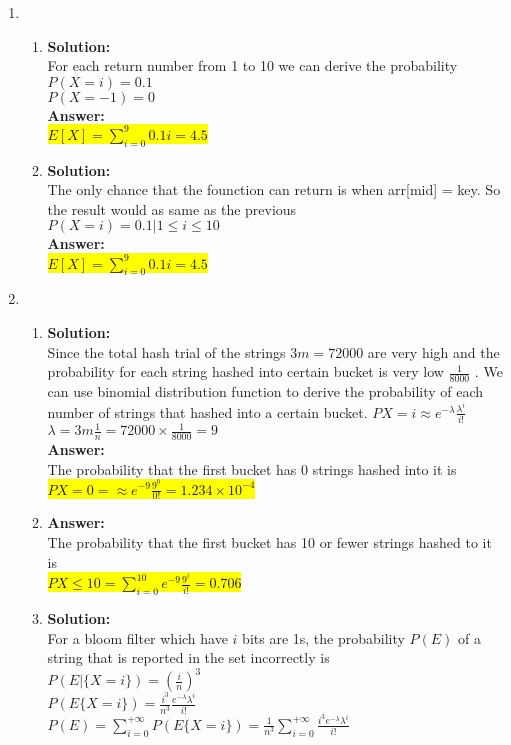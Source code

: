 \documentclass{article}
\newcommand{\myansw}{\textbf{Answer:}\\}
\newcommand{\mysolu}{\textbf{Solution:}\\}
\begin{document}
\begin{enumerate}
	\item
	\begin{enumerate}
		\item
		\mysolu
		For each return number from 1 to 10 we can derive the probability\\
		$P(X=i) = 0.1$\\
		$P(X = -1) = 0$\\
		\myansw
		\colorbox{yellow}{$E[X] = \sum\limits_{i=0}^{9}0.1i =4.5$}\\
		\item
		\mysolu
		The only chance that the founction can return is when arr[mid] = key. So the result would as same as the previous\\
		$P(X=i) = 0.1 | 1\leq i \leq 10$\\
		\myansw
		\colorbox{yellow}{$E[X] = \sum\limits_{i=0}^{9}0.1i =4.5$}\\
	\end{enumerate}
	\item 
	\begin{enumerate}
		\item
		\mysolu
		Since the total hash trial of the strings ${3m = 72000}$ are very high and the probability for each string hashed into certain bucket is very low ${\frac{1}{8000}}$ . We can use binomial distribution function to derive the probability of each number of strings that hashed into a certain bucket.
		$P{X=i} \approx e^{- \lambda}\frac{\lambda^i}{i!}$\\
		${\lambda = 3m \frac{1}{n} = 72000 \times 
		\frac{1}{8000} = 9}$\\
		\myansw
		The probability that the first bucket has 0 strings hashed into it is\\
		\colorbox{yellow}{
			${P{X = 0} =\approx e^{-9}\frac{9^0}{0!}=1.234\times 10^{-4}}$
		}\\
		\item
		\myansw
		The probability that the first bucket has 10 or fewer strings hashed to it is\\
		\colorbox{yellow}{
			${P{X \leq 10} = \sum\limits_{i=0}^{10} e^{-9}\frac{9^i}{i!}=0.706}$
		}
		\item
		\mysolu
		For a bloom filter which have ${i}$ bits are 1s, the probability ${P(E)}$ of a string that is reported in the set incorrectly is\\
		${P(E|\{X = i\})= (\frac{i}{n})^3}$\\
		${P(E\{X=i\}) = \frac{i^3}{n^3} \frac{e^{-\lambda}\lambda^i}{i!}}$\\
		${P(E) = \sum\limits_{i=0}^{+\infty}P(E\{X=i\})=\frac{1}{n^3} \sum\limits_{i=0}^{+\infty}\frac{i^3e^{-\lambda}\lambda^i}{i!}}$\\

\end{enumerate}
\end{enumerate}
\end{document}
